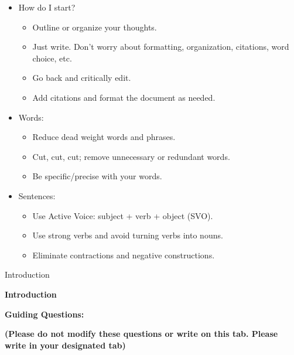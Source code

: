 \begin{itemize}
\item
  How do I start?

  \begin{itemize}
  \item
    Outline or organize your thoughts.
  \item
    Just write. Don't worry about formatting, organization, citations,
    word choice, etc.
  \item
    Go back and critically edit.
  \item
    Add citations and format the document as needed.
  \end{itemize}
\item
  Words:

  \begin{itemize}
  \item
    Reduce dead weight words and phrases.
  \item
    Cut, cut, cut; remove unnecessary or redundant words.
  \item
    Be specific/precise with your words.
  \end{itemize}
\item
  Sentences:

  \begin{itemize}
  \item
    Use Active Voice: subject + verb + object (SVO).
  \item
    Use strong verbs and avoid turning verbs into nouns.
  \item
    Eliminate contractions and negative constructions.
  \end{itemize}
\end{itemize}

Introduction

\textbf{Introduction}

\textbf{Guiding Questions:}

\textbf{(Please do not modify these questions or write on this tab.
Please write in your designated tab)}

